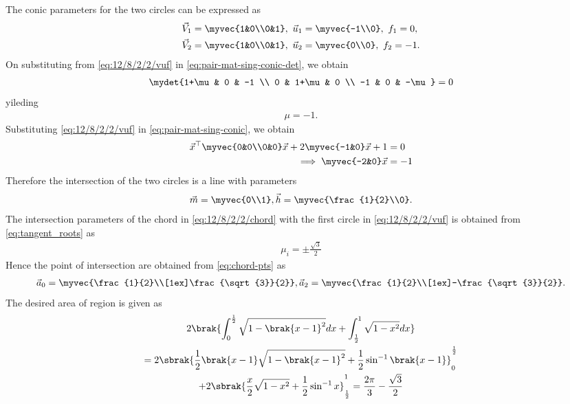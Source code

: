 The conic parameters for the two circles can be expressed as
\begin{align}
\begin{split}
	\vec{V}_1 &= \myvec{1&0\\0&1},\
	\vec{u}_1 = \myvec{-1\\0},\
	f_1 = 0,
	\\
	\vec{V}_2 &= \myvec{1&0\\0&1},\
	\vec{u}_2 = \myvec{0\\0},\
	f_2 = -1.
\end{split}
	\label{eq:12/8/2/2/vuf}
\end{align}
On substituting from
	\eqref{eq:12/8/2/2/vuf}
	in
	  \eqref{eq:pair-mat-sing-conic-det}, we obtain
\begin{align}
	\mydet{1+\mu & 0 & -1 \\ 0 & 1+\mu & 0 \\ -1 & 0 & -\mu} = 0
\end{align}
yileding
\begin{align}
	\mu= -1.
\end{align}
Substituting 
	\eqref{eq:12/8/2/2/vuf}
in 
	  \eqref{eq:pair-mat-sing-conic},
	  we obtain
\begin{align}
	\vec{x}^\top\myvec{0&0\\0&0}\vec{x} + 2\myvec{-1&0}\vec{x} + 1 &= 0\\
\implies	\myvec{-2&0}\vec{x} &= -1 
\label{eq:12/8/2/2/chord}
\end{align}
Therefore the intersection of the two circles is a line with parameters
\begin{align}
	\vec{m} = \myvec{0\\1},  \vec{h} = \myvec{\frac{1}{2}\\0}.
\end{align}
	The intersection parameters of the 
	chord in 
\eqref{eq:12/8/2/2/chord}
with the 
first circle in \eqref{eq:12/8/2/2/vuf} is obtained from 
\eqref{eq:tangent_roots}
	as
\begin{align}
	\mu_i= \pm\frac{\sqrt{3}}{2}
\end{align}
Hence the point of intersection are
obtained from
	\eqref{eq:chord-pts}
	as
\begin{align}
	\vec{a}_0 = \myvec{\frac{1}{2}\\[1ex]\frac{\sqrt{3}}{2}}, \vec{a}_2 = \myvec{\frac{1}{2}\\[1ex]-\frac{\sqrt{3}}{2}}.
\end{align}
The desired area of region is given as
\begin{multline}
	2\brak{\int_{0}^{\frac{1}{2}} \sqrt{1-\brak{x-1}^2}dx + \int_{\frac{1}{2}}^{1} \sqrt{1-x^2}dx}\\
		=2\sbrak{\frac{1}{2}\brak{x-1}\sqrt{1-\brak{x-1}^2}+\frac{1}{2}\sin^{-1}\brak{x-1}}_{0}^{\frac{1}{2}}\\
		 +2\sbrak{\frac{x}{2}\sqrt{1-x^2}+\frac{1}{2}\sin^{-1}x}_{\frac{1}{2}}^{1}
	= \frac{2\pi}{3}-\frac{\sqrt{3}}{2}
\end{multline}
